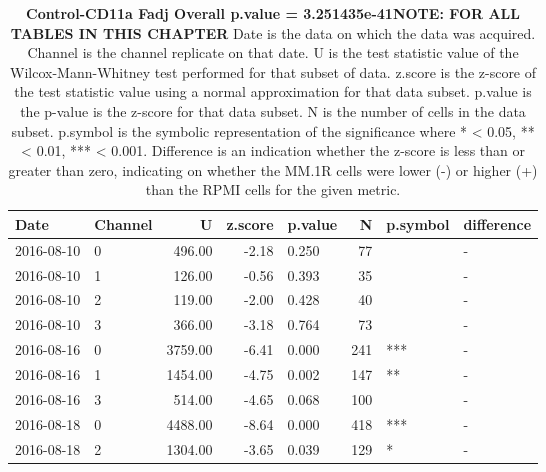 \begin{table}[ht]
\caption[Control-CD11a FADJ]{\textbf{Control-CD11a Fadj Overall p.value = 3.251435e-41\newline NOTE: FOR ALL TABLES IN THIS CHAPTER} Date is the data on which the data was acquired. Channel is the channel replicate on that date. U is the test statistic value of the Wilcox-Mann-Whitney test performed for that subset of data. z.score is the z-score of the test statistic value using a normal approximation for that data subset. p.value is the p-value is the z-score for that data subset. N is the number of cells in the data subset. p.symbol is the symbolic representation of the significance where * < 0.05, ** < 0.01, *** < 0.001. Difference is an indication whether the z-score is less than or greater than zero, indicating on whether the MM.1R cells were lower (-) or higher (+) than the RPMI cells for the given metric.}
\centering
\begin{tabular}{llrrlrll}
  \hline
Date & Channel & U & z.score & p.value & N & p.symbol & difference \\ 
  \hline
2016-08-10 & 0 & 496.00 & -2.18 & 0.250 &  77 &  & - \\ 
  2016-08-10 & 1 & 126.00 & -0.56 & 0.393 &  35 &  & - \\ 
  2016-08-10 & 2 & 119.00 & -2.00 & 0.428 &  40 &  & - \\ 
  2016-08-10 & 3 & 366.00 & -3.18 & 0.764 &  73 &  & - \\ 
  2016-08-16 & 0 & 3759.00 & -6.41 & 0.000 & 241 & *** & - \\ 
  2016-08-16 & 1 & 1454.00 & -4.75 & 0.002 & 147 & ** & - \\ 
  2016-08-16 & 3 & 514.00 & -4.65 & 0.068 & 100 &  & - \\ 
  2016-08-18 & 0 & 4488.00 & -8.64 & 0.000 & 418 & *** & - \\ 
  2016-08-18 & 2 & 1304.00 & -3.65 & 0.039 & 129 & * & - \\ 
   \hline
\end{tabular}
\end{table}
